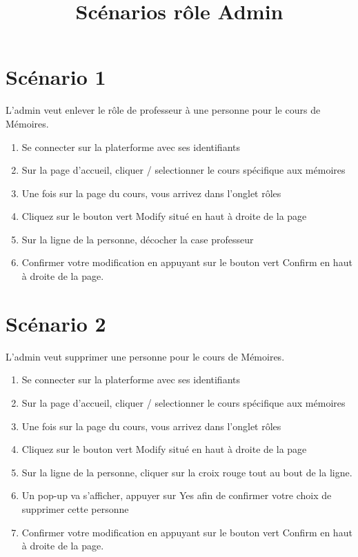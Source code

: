 \documentclass[a4paper, 11pt]{article}
\title{Scénarios rôle \bf Admin}
\author{}
\begin{document}
\maketitle

\section*{Scénario 1}
L'admin veut enlever le rôle de professeur à une personne pour le cours de Mémoires.

\begin{tcolorbox}
    \begin{enumerate}
        \item Se connecter sur la platerforme avec ses identifiants
        \item Sur la page d'accueil, cliquer / selectionner le cours spécifique aux mémoires
        \item Une fois sur la page du cours, vous arrivez dans l'onglet rôles
        \item Cliquez sur le bouton vert \og Modify\fg{} situé en haut à droite de la page
        \item Sur la ligne de la personne, décocher la case professeur 
        \item Confirmer votre modification en appuyant sur le bouton vert \og Confirm\fg{} en haut à droite de la page.
    \end{enumerate}
\end{tcolorbox}
\newpage
\section*{Scénario 2}
L'admin veut supprimer une personne pour le cours de Mémoires.

\begin{tcolorbox}
    \begin{enumerate}
        \item Se connecter sur la platerforme avec ses identifiants
        \item Sur la page d'accueil, cliquer / selectionner le cours spécifique aux mémoires
        \item Une fois sur la page du cours, vous arrivez dans l'onglet rôles
        \item Cliquez sur le bouton vert \og Modify\fg{} situé en haut à droite de la page
        \item Sur la ligne de la personne, cliquer sur la croix rouge tout au bout de la ligne. 
        \item Un pop-up va s'afficher, appuyer sur \og Yes\fg{} afin de confirmer votre choix de supprimer cette personne
        \item Confirmer votre modification en appuyant sur le bouton vert \og Confirm\fg{} en haut à droite de la page.
    \end{enumerate}
\end{tcolorbox}
\end{document}
